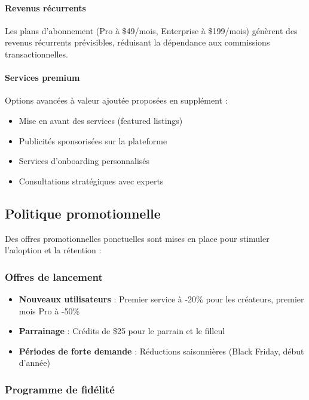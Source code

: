 \paragraph{Revenus récurrents}

Les plans d'abonnement (Pro à \$49/mois, Enterprise à \$199/mois) génèrent des revenus récurrents prévisibles, réduisant la dépendance aux commissions transactionnelles.

\paragraph{Services premium}

Options avancées à valeur ajoutée proposées en supplément :
\begin{itemize}
    \item Mise en avant des services (featured listings)
    \item Publicités sponsorisées sur la plateforme
    \item Services d'onboarding personnalisés
    \item Consultations stratégiques avec experts
\end{itemize}

\subsection{Politique promotionnelle}

Des offres promotionnelles ponctuelles sont mises en place pour stimuler l'adoption et la rétention :

\subsubsection{Offres de lancement}

\begin{itemize}
    \item \textbf{Nouveaux utilisateurs} : Premier service à -20\% pour les créateurs, premier mois Pro à -50\%
    \item \textbf{Parrainage} : Crédits de \$25 pour le parrain et le filleul
    \item \textbf{Périodes de forte demande} : Réductions saisonnières (Black Friday, début d'année)
\end{itemize}

\subsubsection{Programme de fidélité}

